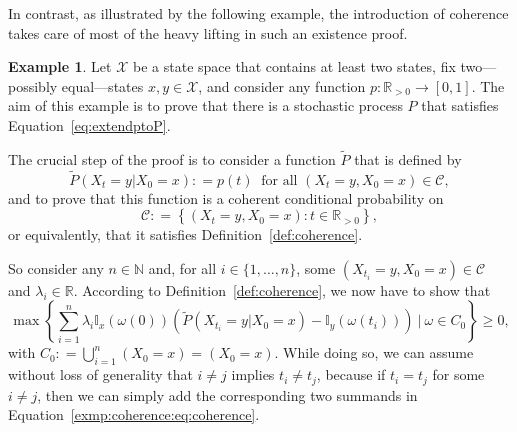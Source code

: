 \documentclass[10pt,a4paper]{paper}
\theoremstyle{definition}
\newtheorem{exmp}{Example}
\newcommand{\nats}{\mathbb{N}}
\newcommand{\reals}{\mathbb{R}}
\newcommand{\realspos}{\reals_{>0}}
\newcommand{\states}{\mathcal{X}}
\newcommand{\ind}[1]{\mathbb{I}_{#1}}
\newcommand{\coloneqq}{:\!=}
\begin{document}
In contrast, as illustrated by the following example, the introduction of coherence takes care of most of the heavy lifting in such an existence proof.
\begin{exmp}\label{exmp:coherence_constructs_process}
Let $\states$ be a state space that contains at least two states, fix two---possibly equal---states $x,y\in\states$, and consider any function $p:\realspos\to[0,1]$. The aim of this example is to prove that there is a stochastic process $P$ that satisfies Equation~\eqref{eq:extendptoP}.

The crucial step of the proof is to consider a function $\tilde{P}$ that is defined by
\begin{equation}\label{exmp:coherence:eq:probdef}
\tilde{P}(X_t=y\vert X_0=x) \coloneqq p(t)
~\text{ for all $(X_t=y,X_0=x)\in\mathcal{C}$},
\end{equation}
and to prove that this function is a coherent conditional probability on
\begin{equation*}
\mathcal{C} \coloneqq \left\{ (X_t=y,X_0=x)\colon t\in\realspos \right\},
\end{equation*}
or equivalently, that it satisfies Definition~\ref{def:coherence}.

So consider any $n\in\nats$ and, for all $i\in\{1,\ldots,n\}$, some $(X_{t_i}=y,X_0=x)\in\mathcal{C}$ and $\lambda_i\in\reals$. According to Definition~\ref{def:coherence}, we now have to show that
\begin{equation}\label{exmp:coherence:eq:coherence}
\max\left\{ \sum_{i=1}^n \lambda_i\ind{x}(\omega(0))\left(\tilde{P}(X_{t_i}=y\vert X_0=x) - \ind{y}(\omega(t_i))\right)~\Bigg\vert~ \omega\in C_0 \right\} \geq 0,
\end{equation}
with $C_0\coloneqq \bigcup_{i=1}^n (X_0=x)=(X_0=x)$. 
While doing so, we can assume without loss of generality that $i\neq j$ implies $t_i\neq t_j$, because if $t_i=t_j$ for some $i\neq j$, then we can simply add the corresponding two summands in Equation~\eqref{exmp:coherence:eq:coherence}.


\end{exmp}
\end{document}
